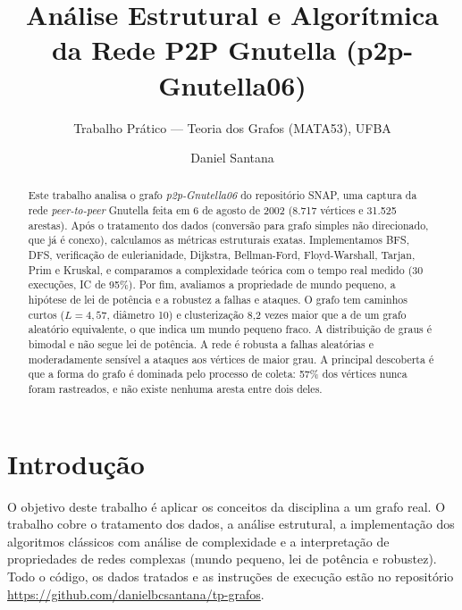 \documentclass[sigconf]{webmedia}
\newcommand{\repo}{\url{https://github.com/danielbcsantana/tp-grafos}}
\begin{document}
\title[Análise da Rede P2P Gnutella (p2p-Gnutella06)]{Análise Estrutural e Algorítmica da Rede P2P Gnutella (p2p-Gnutella06)}
\subtitle{Trabalho Prático --- Teoria dos Grafos (MATA53), UFBA}

\author{Daniel Santana}

\renewcommand{\shortauthors}{Santana}

\begin{abstract}
Este trabalho analisa o grafo \textit{p2p-Gnutella06} do repositório SNAP, uma
captura da rede \textit{peer-to-peer} Gnutella feita em 6 de agosto de 2002
(8.717 vértices e 31.525 arestas). Após o tratamento dos dados (conversão para grafo
simples não direcionado, que já é conexo), calculamos as métricas estruturais
exatas. Implementamos BFS, DFS, verificação de eulerianidade, Dijkstra,
Bellman-Ford, Floyd-Warshall, Tarjan, Prim e Kruskal, e comparamos a complexidade
teórica com o tempo real medido (30 execuções, IC de 95\%). Por fim, avaliamos a
propriedade de mundo pequeno, a hipótese de lei de potência e a robustez a falhas e
ataques. O grafo tem caminhos curtos ($L=4{,}57$, diâmetro 10) e clusterização
8,2 vezes maior que a de um grafo aleatório equivalente, o que indica um mundo
pequeno fraco. A distribuição de graus é bimodal e não segue lei de potência.
A rede é robusta a falhas aleatórias e moderadamente sensível a ataques aos
vértices de maior grau. A principal descoberta é que a forma do grafo é dominada
pelo processo de coleta: 57\% dos vértices nunca foram rastreados, e não existe
nenhuma aresta entre dois deles.
\end{abstract}


\maketitle

\section{Introdução}
O objetivo deste trabalho é aplicar os conceitos da disciplina a um grafo real. O
trabalho cobre o tratamento dos dados, a análise estrutural, a implementação dos
algoritmos clássicos com análise de complexidade e a interpretação de propriedades
de redes complexas (mundo pequeno, lei de potência e robustez). Todo o código, os
dados tratados e as instruções de execução estão no repositório \repo.
\end{document}

